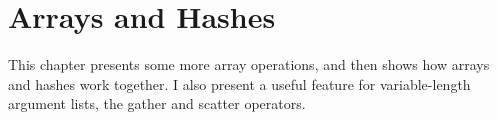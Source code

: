 \documentclass[10pt]{book}
\begin{document}
\chapter{Arrays and Hashes}
\label{arrhashchap}


This chapter presents some more array operations, and then
shows how arrays and hashes work together.
I also present a useful feature for variable-length argument lists,
the gather and scatter operators.
\end{document}
